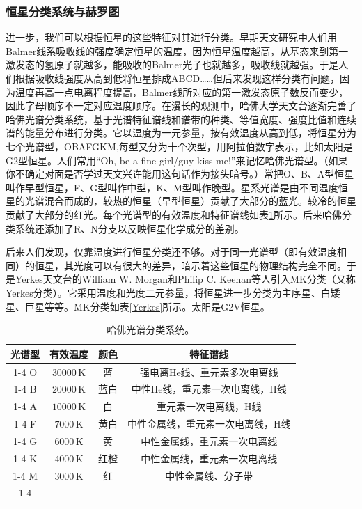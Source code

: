 \documentclass[../天体物理基础.tex]{subfiles}
\begin{document}
\subsubsection{恒星分类系统与赫罗图}
进一步，我们可以根据恒星的这些特征对其进行分类。早期天文研究中人们用Balmer线系吸收线的强度确定恒星的温度，因为恒星温度越高，从基态来到第一激发态的氢原子就越多，能吸收的Balmer光子也就越多，吸收线就越强。于是人们根据吸收线强度从高到低将恒星排成ABCD……但后来发现这样分类有问题，因为温度再高一点电离程度提高，Balmer线所对应的第一激发态原子数反而变少，因此字母顺序不一定对应温度顺序。在漫长的观测中，哈佛大学天文台逐渐完善了哈佛光谱分类系统，基于光谱特征谱线和谱带的种类、等值宽度、强度比值和连续谱的能量分布进行分类。它以温度为一元参量，按有效温度从高到低，将恒星分为七个光谱型，OBAFGKM,每型又分为十个次型，用阿拉伯数字表示，比如太阳是G2型恒星。人们常用``Oh, be a fine girl/guy kiss me!''来记忆哈佛光谱型。（如果你不确定对面是否学过天文兴许能用这句话作为接头暗号。）常把O、B、A型恒星叫作早型恒星，F、G型叫作中型，K、M型叫作晚型。星系光谱是由不同温度恒星的光谱混合而成的，较热的恒星（早型恒星）贡献了大部分的蓝光。较冷的恒星贡献了大部分的红光。每个光谱型的有效温度和特征谱线如表\ref{哈佛}所示。后来哈佛分类系统还添加了R、N分支以反映恒星化学成分的差别。

后来人们发现，仅靠温度进行恒星分类还不够。对于同一光谱型（即有效温度相同）的恒星，其光度可以有很大的差异，暗示着这些恒星的物理结构完全不同。于是Yerkes天文台的William W. Morgan和Philip C. Keenan等人引入MK分类（又称Yerkes分类）。它采用温度和光度二元参量，将恒星进一步分类为主序星、白矮星、巨星等等。MK分类如表\ref{Yerkes}所示。太阳是G2V恒星。

\begin{table}[!htbp]
\centering
\caption{哈佛光谱分类系统。}
\begin{tabular}{c c c c}
\hline
光谱型 & 有效温度 & 颜色 & 特征谱线\\
\cline{1-4}
O & $30000\,\mathrm{K}$ & 蓝 & 强电离$\mathrm{He}$线、重元素多次电离线\\
\cline{1-4}
B & $20000\,\mathrm{K}$ & 蓝白 & 中性$\mathrm{He}$线，重元素一次电离线，$\mathrm{H}$线\\
\cline{1-4}
A & $10000\,\mathrm{K}$ & 白 & 重元素一次电离线，$\mathrm{H}$线\\
\cline{1-4}
F & $7000\,\mathrm{K}$ & 黄白 & 中性金属线，重元素一次电离线，$\mathrm{H}$线\\
\cline{1-4}
G & $6000\,\mathrm{K}$ & 黄 & 中性金属线，重元素一次电离线\\
\cline{1-4}
K & $4000\,\mathrm{K}$ & 红橙 & 中性金属线，重元素一次电离线\\
\cline{1-4}
M & $3000\,\mathrm{K}$ & 红 & 中性金属线、分子带\\
\cline{1-4}
\end{tabular}
\label{哈佛}
\end{table}
\end{document}
